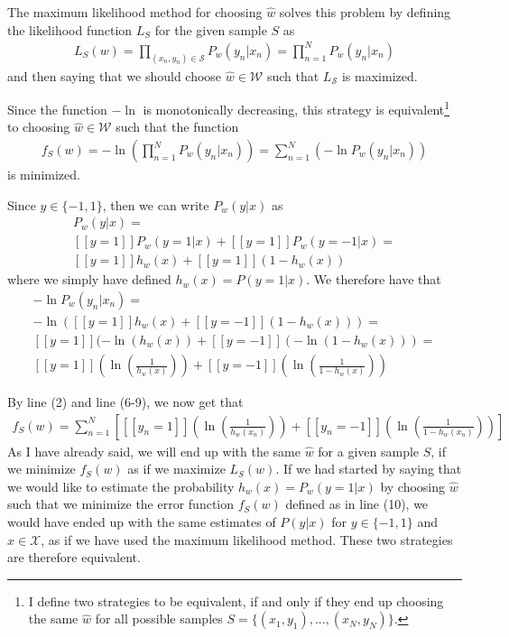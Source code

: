 \documentclass[12pt]{article}
\begin{document}
The maximum likelihood method for choosing $\hat{w}$ solves this problem by defining the likelihood function $L_S$ for the given sample $S$ as
\begin{align}
L_S(w) = \prod_{(x_n,y_n)\in \mathcal{S}}  P_w(y_n|x_n)
= \prod_{n=1}^N P_w(y_n|x_n)
\end{align}
and then saying that we should choose $\hat{w} \in \mathcal{W}$ such that $L_\mathcal{S}$ is maximized.

Since the function $-\ln$ is monotonically decreasing, this strategy is equivalent\footnote{I define two strategies to be equivalent, if and only if they end up choosing the same $\hat{w}$ for all possible samples $S = \{(x_1,y_1),...,(x_N,y_N)\}$.} to choosing $\hat{w} \in \mathcal{W}$ such that the function
\begin{align}
f_S(w) = -\ln \left( \prod_{n=1}^N P_w(y_n|x_n) \right) = \sum_{n=1}^N \left( - \ln P_w(y_n|x_n) \right)
\end{align}
is minimized. 

Since $y \in \{-1,1\}$, then we can write $P_w(y|x)$ as
\begin{align}
P_w(y|x)  = \\ 
[[y = 1]] P_w(y = 1|x) + [[y = 1]] P_w(y = -1|x) = \\ 
[[y = 1]] h_w(x) + [[y = 1]] (1 - h_w(x))
\end{align}
where we simply have defined $h_w(x) = P(y = 1 | x)$. We therefore have that
\begin{align}
- \ln P_w(y_n|x_n) = \\ 
-\ln ([[y = 1]] h_w(x) + [[y = -1]] (1 - h_w(x))) = \\ 
[[y = 1]](-\ln (h_w(x)) + [[y = -1]](-\ln (1 - h_w(x))) = \\ 
[[y = 1]]\left(\ln \left( \frac{1}{h_w(x)}\right)\right) + [[y = -1]]\left(\ln \left( \frac{1}{1 - h_w(x)}\right)\right)
\end{align}

By line (2) and line (6-9), we now get that
\begin{align}
f_S(w) = \sum_{n=1}^N \left[ [[y_n = 1]]\left(\ln \left( \frac{1}{h_w(x_n)}\right)\right) + [[y_n = -1]]\left(\ln \left( \frac{1}{1 - h_w(x_n)}\right)\right) \right]
\end{align}
As I have already said, we will end up with the same $\hat{w}$ for a given sample $S$, if we minimize $f_S(w)$ as if we maximize $L_S(w)$. If we had started by saying that we would like to estimate the probability $h_w(x) = P_w(y = 1|x)$ by choosing $\hat{w}$ such that we minimize the error function $f_S(w)$ defined as in line (10), we would have ended up with the same estimates of $P(y|x)$ for $y \in \{-1,1\}$ and $x\in \mathcal{X}$, as if we have used the maximum likelihood method. These two strategies are therefore equivalent.
\end{document}
